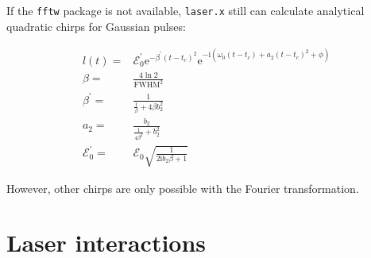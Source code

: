 \documentclass[a4paper,11pt,DIV=15,openany,twoside=false]{scrbook}
\newcommand{\tthdump}[1]{#1}
\newcommand{\ttt}[1]{\texttt{#1}}
\newcommand{\E}{\ensuremath{\mathrm{e}}}
\newcommand{\I}{\ensuremath{\mathrm{i}}}
\begin{document}
If the \ttt{fftw} package is not available, \ttt{laser.x} still can calculate analytical quadratic chirps for Gaussian pulses:
\tthdump{
  \begin{align}
    l(t)=&
    \mathcal{E}_0^\prime
    \E^{-\beta^\prime(t-t_c)^2}
    \E^{-\I\left(
      \omega_0(t-t_c)+a_2(t-t_c)^2+\phi
    \right)}\\
    \beta=&\frac{4\ln 2}{\mathrm{FWHM}^2}\\
    \beta^\prime=&\frac{1}{\frac{1}{\beta}+4\beta b_2^2}\\
    a_2=&\frac{b_2}{\frac{1}{4\beta^2}+b^2_2}\\
    \mathcal{E}_0^\prime=&\mathcal{E}_0\sqrt{\frac{1}{2\I b_2\beta+1}}
  \end{align}
}
However, other chirps are only possible with the Fourier transformation.


\section{Laser interactions}\label{met:laser}
\end{document}

